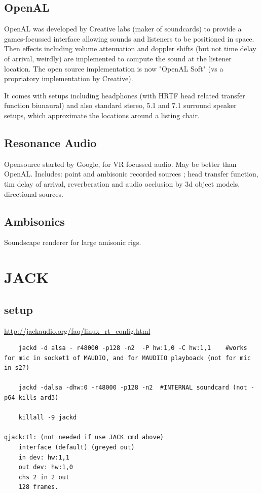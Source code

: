 \documentclass[oneside,english]{scrbook}
\begin{document}
\section{OpenAL}
OpenAL was developed by Creative labs (maker of soundcards) to provide a games-focussed interface allowing sounds and listeners to be positioned in space.  Then effects including volume attenuation and doppler shifts (but not time delay of arrival, weirdly) are implemented to compute the sound at the listener location.  The open source implementation is now "OpenAL Soft" (vs a propriatory implementation by Creative).

It comes with setups including headphones (with HRTF head related transfer function biunaural) and also standard stereo, 5.1 and 7.1 surround speaker setups, which approximate the locations around a listing chair.

\section{Resonance Audio}
Opensource started by Google, for VR focussed audio.  May be better than OpenAL. Includes:   point and ambisonic recorded sources ; head transfer function, tim delay of arrival, reverberation and audio occlusion by 3d object models, directional sources.

\section{Ambisonics}
Soundscape renderer for large amisonic rigs.


\chapter{JACK}

\section{setup}
\url{http://jackaudio.org/faq/linux_rt_config.html}

\begin{lstlisting}
    jackd -d alsa - r48000 -p128 -n2  -P hw:1,0 -C hw:1,1    #works for mic in socket1 of MAUDIO, and for MAUDIIO playboack (not for mic in s2?)

	jackd -dalsa -dhw:0 -r48000 -p128 -n2  #INTERNAL soundcard (not -p64 kills ard3)
	
	killall -9 jackd

qjackctl: (not needed if use JACK cmd above)
	interface (default) (greyed out)
	in dev: hw:1,1
	out dev: hw:1,0	
	chs 2 in 2 out
	128 frames.
\end{lstlisting}
\end{document}
